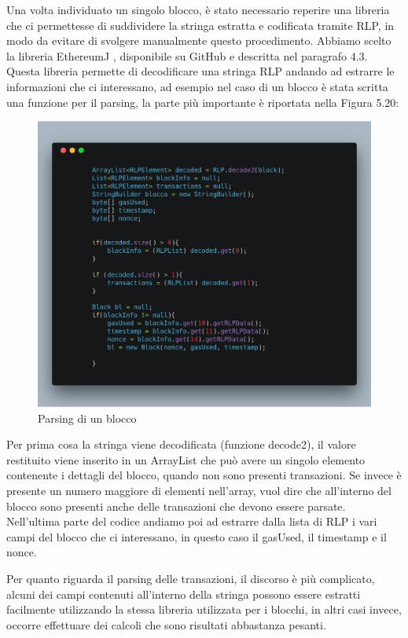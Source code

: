 \documentclass[12pt]{report}
\begin{document}
Una volta individuato un singolo blocco, è stato necessario reperire una libreria che ci permettesse di suddividere la stringa estratta e codificata tramite RLP, in modo da evitare di svolgere manualmente questo procedimento.
Abbiamo scelto la libreria EthereumJ \cite{EthereumJ}, disponibile su GitHub e descritta nel paragrafo 4.3.
Questa libreria permette di decodificare una stringa RLP andando ad estrarre le informazioni che ci interessano, ad esempio nel caso di un blocco è stata scritta una funzione per il parsing, la parte più importante è riportata nella Figura 5.20:

\begin{figure}[H]
    \includegraphics[width=\textwidth]{carbon-14}
    \caption{Parsing di un blocco}
\end{figure}


Per prima cosa la stringa viene decodificata (funzione decode2), il valore restituito viene inserito in un ArrayList che può avere un singolo elemento contenente i dettagli del blocco, quando non sono presenti transazioni. Se invece è presente un numero maggiore di elementi nell'array, vuol dire che all'interno del blocco sono presenti anche delle transazioni che devono essere parsate.
Nell'ultima parte del codice andiamo poi ad estrarre dalla lista di RLP i vari campi del blocco che ci interessano, in questo caso il gasUsed, il timestamp e il nonce.

Per quanto riguarda il parsing delle transazioni, il discorso è più complicato, alcuni dei campi contenuti all'interno della stringa possono essere estratti facilmente utilizzando la stessa libreria utilizzata per i blocchi, in altri casi invece, occorre effettuare dei calcoli che sono risultati abbastanza pesanti.
\end{document}
